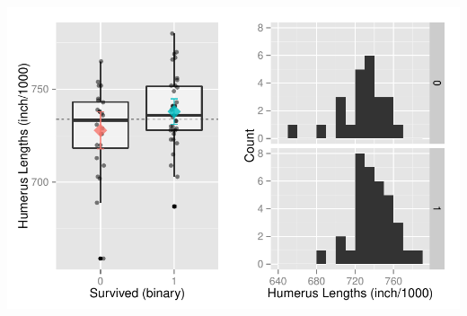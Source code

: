 \documentclass{article}\usepackage[]{graphicx}\usepackage[]{color}
\makeatletter
\def\maxwidth{ %
  \ifdim\Gin@nat@width>\linewidth
    \linewidth
  \else
    \Gin@nat@width
  \fi
}
\newenvironment{knitrout}{}{} %
\makeatother
\begin{document}
\begin{knitrout}
{\centering \includegraphics[width=\maxwidth]{figure/3_a_plot-1} 

}



\end{knitrout}
\end{document}

